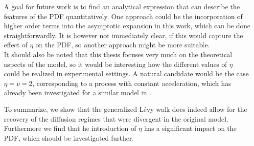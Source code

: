 A goal for future work is to find an analytical expression that can describe the features of the PDF quantitatively. One approach could be the incorporation of higher order terms into the asymptotic expansion in this work, which can be done straightforwardly. It is however not immediately clear, if this would capture the effect of $\eta$ on the \gls*{PDF}, so another approach might be more suitable.\\
It should also be noted that this thesis focuses very much on the theoretical aspects of the model, so it would be interesting how the different values of $\eta$ could be realized in experimental settings. A natural candidate would be the case $\eta=\nu=2$, corresponding to a process with constant acceleration, which has already been investigated for a similar model in \cite{burioni2013rare, burioni2014scaling}.

To summarize, we show that the generalized L\'evy walk does indeed allow for the recovery of the diffusion regimes that were divergent in the original model. Furthermore we find that he introduction of $\eta$ has a significant impact on the \gls*{PDF}, which should be investigated further.

